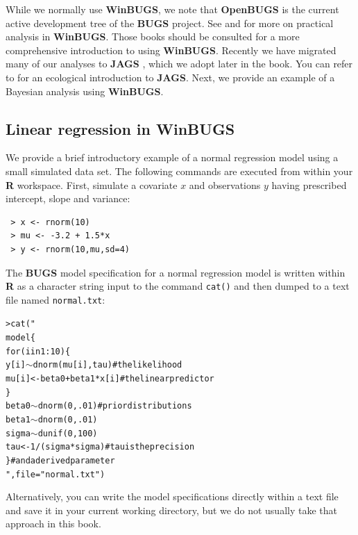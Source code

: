 While we normally use {\bf WinBUGS}, we note that {\bf OpenBUGS} is
the current active development tree of the {\bf BUGS} project. See
\citet[][]{kery:2010} and \citet[][especially
Appendix 1]{kery_schaub:2011} for more on practical analysis in {\bf
  WinBUGS}.  
Those books should be consulted for a more comprehensive
introduction to using {\bf WinBUGS}.  Recently we have migrated many
of our analyses to {\bf JAGS} \citep{plummer:2009}, which we adopt
later in the book. You can refer to \citet{hobbs:2011} for an
ecological introduction to {\bf JAGS}.  Next, we provide an example of
a Bayesian analysis using {\bf WinBUGS}.

\subsection{Linear regression in WinBUGS}
\label{GLMM.sect.linear}

We provide a brief introductory example of a normal regression model
using a small simulated data set. The following commands are executed
from within your {\bf R} workspace.
First, simulate a covariate $x$ and observations $y$ having
prescribed intercept, slope and variance:
\begin{verbatim}
 > x <- rnorm(10)
 > mu <- -3.2 + 1.5*x
 > y <- rnorm(10,mu,sd=4)
\end{verbatim}
The {\bf BUGS} model specification for a normal regression model is
written within {\bf R} as a character string input to the command
\mbox{\tt cat()} and
then dumped to a text file named \mbox{\tt normal.txt}:
\begin{alltt}
> cat("
 model\{ 
   for (i in 1:10)\{ 
      y[i] \(\sim\) dnorm(mu[i],tau)         # the likelihood
      mu[i] <- beta0 + beta1*x[i]     # the linear predictor
    \}
   beta0 \(\sim\) dnorm(0,.01)               # prior distributions
   beta1 \(\sim\) dnorm(0,.01)
   sigma \(\sim\) dunif(0,100)
   tau <- 1/(sigma*sigma)             # tau is the precision
\}				       #   and a derived parameter
",file="normal.txt")
\end{alltt}
Alternatively, you
can write the model specifications directly within a text file and
save it in your current working directory, but we do not usually take
that approach in this book.

